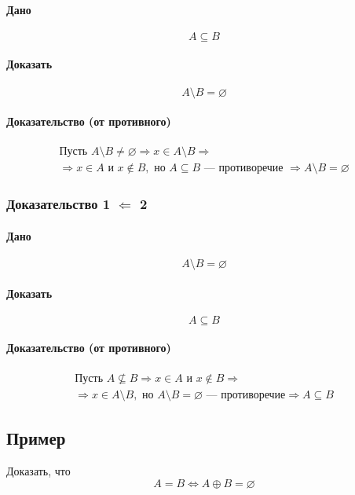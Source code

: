 \documentclass{article}
\begin{document}
\paragraph{Дано}
\[
    A \subseteq B
\]

\paragraph{Доказать}
\[
    A \setminus B = \varnothing
\]

\paragraph{Доказательство (от противного)}
\begin{gather*}
    \text{Пусть } A \setminus B \neq \varnothing \Rightarrow x \in A \setminus B \Rightarrow \\
    \Rightarrow x \in A \text{ и } x \notin B, \text{ но } A \subseteq B \text{ --- противоречие } \Rightarrow A \setminus B = \varnothing
\end{gather*}


\subsubsection{Доказательство 1 $\Leftarrow$ 2}
\paragraph{Дано}
\[
    A \setminus B = \varnothing
\]

\paragraph{Доказать}
\[
    A \subseteq B
\]

\paragraph{Доказательство (от противного)}
\begin{gather*}
    \text{Пусть } A \nsubseteq B \Rightarrow x \in A \text{ и } x \notin B \Rightarrow \\
    \Rightarrow x \in A \setminus B, \text{ но } A \setminus B = \varnothing \text{ --- противоречие} \Rightarrow A \subseteq B
\end{gather*}


\subsection{Пример}
Доказать, что
\[
    A = B \Leftrightarrow A \oplus B = \varnothing
\]
\end{document}
